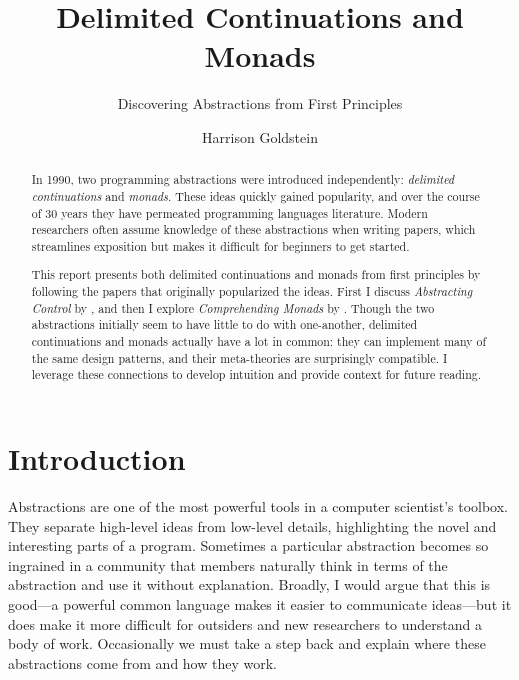\documentclass[acmsmall, nonacm, screen]{acmart}
\begin{document}
\title{Delimited Continuations and Monads}
\subtitle{Discovering Abstractions from First Principles}

\author{Harrison Goldstein}

\renewcommand{\shortauthors}{Goldstein}

\begin{abstract}
  In 1990, two programming abstractions were introduced independently: {\em delimited
  continuations} and {\em monads}. These ideas quickly gained popularity, and over the course of
  30 years they have permeated programming languages literature. Modern researchers often assume
  knowledge of these abstractions when writing papers, which streamlines exposition but makes it
  difficult for beginners to get started.
  
  This report presents both delimited continuations and monads from first principles by following
  the papers that originally popularized the ideas. First I discuss {\em Abstracting Control} by
  \citet{danvy1990abstracting}, and then I explore {\em Comprehending Monads} by
  \citet{wadler1990comprehending}. Though the two abstractions initially seem to have little to
  do with one-another, delimited continuations and monads actually have a lot in common: they can
  implement many of the same design patterns, and their meta-theories are surprisingly
  compatible. I leverage these connections to develop intuition and provide context for future
  reading.
\end{abstract}

\maketitle

\section{Introduction} \label{sec:introduction}
Abstractions are one of the most powerful tools in a computer scientist's toolbox. They separate
high-level ideas from low-level details, highlighting the novel and interesting parts of a
program. Sometimes a particular abstraction becomes so ingrained in a community that members
naturally think in terms of the abstraction and use it without explanation. Broadly, I would
argue that this is good---a powerful common language makes it easier to communicate ideas---but
it does make it more difficult for outsiders and new researchers to understand a body of work.
Occasionally we must take a step back and explain where these abstractions come from and how they
work.
\end{document}
